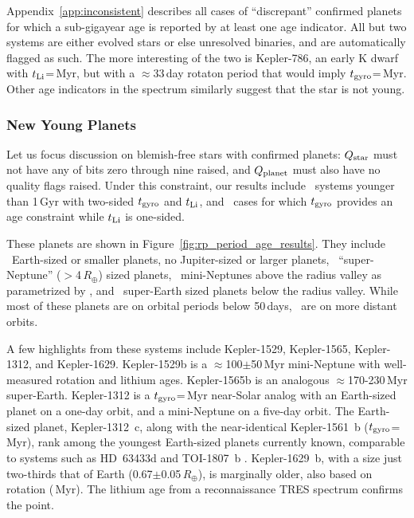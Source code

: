 \documentclass[11pt,twocolumn,tighten]{aastex63}
\begin{document}
Appendix~\ref{app:inconsistent} describes all cases of ``discrepant''
confirmed planets for which a sub-gigayear age is reported by at least
one age indicator.  All but two systems are either evolved stars or
else unresolved binaries, and are automatically flagged as such.  The
more interesting of the two is Kepler-786, an early K dwarf with
$t_{\rm Li}$=\kepseveneightsix\,Myr, but with a $\approx$33\,day
rotaton period that would imply $t_{\rm
gyro}$=\kepseveneightsixgyro\,Myr.  Other age indicators in the
spectrum similarly suggest that the star is not young. 



\subsubsection{New Young Planets}

Let us focus discussion on blemish-free stars with 
confirmed planets: $Q_{\rm star}$ must not have any of bits zero
through nine raised, and $Q_{\rm planet}$ must also have no quality flags
raised.  Under this constraint, our results include
\ltonegyrhighqconfirmedtwosided\ systems younger than 1\,Gyr with
two-sided $t_{\rm gyro}$ and $t_{\rm Li}$, and
\ltonegyrhighqconfirmedonesided\ cases for which $t_{\rm gyro}$
provides an age constraint while $t_{\rm Li}$ is one-sided.

These planets are shown in Figure~\ref{fig:rp_period_age_results}.
They include \nearthshighqconfirmed\ Earth-sized or smaller planets,
no Jupiter-sized or larger planets, \nsubsaturnshighqconfirmed\
``super-Neptune'' ($>$4\,$R_\oplus$) sized planets,
\nminineptuneshighqconfirmed\ mini-Neptunes above the radius valley
as parametrized by \citealt{2018MNRAS.479.4786V}, and
\nsuperearthshighqconfirmed\ super-Earth sized planets below the
radius valley.  While most of these planets are on orbital periods
below 50\,days, \nlongperiodhighqconfirmed\ are on more distant
orbits.

A few highlights from these systems include
Kepler-1529, Kepler-1565, Kepler-1312, and Kepler-1629.  Kepler-1529b
is a $\approx$100$\pm$50\,Myr mini-Neptune with well-measured rotation
and lithium ages.  Kepler-1565b is an analogous $\approx$170-230\,Myr
super-Earth.  Kepler-1312 is a $t_{\rm gyro}$=\kepthirteentwelve\,Myr
near-Solar analog with an Earth-sized planet
on a one-day orbit, and a mini-Neptune on a five-day orbit.  The
Earth-sized planet, Kepler-1312~c, along with the near-identical
Kepler-1561~b ($t_{\rm gyro}$=\kepfifteensixone\,Myr), rank among the
youngest Earth-sized planets currently known, comparable to systems
such as HD~63433d \citep[1.1\,$R_\oplus$,
$414$$\pm$$23$\,Myr;][]{2024AJ....167...54C} and TOI-1807~b
\citep[1.3\,$R_\oplus$, 180$\pm$40\,Myr;][]{2021AJ....162...54H}.
Kepler-1629~b, with a size just two-thirds that of Earth
(0.67$\pm$0.05\,$R_\oplus$), is marginally older, also based on
rotation (\kepsixteentwonine\,Myr).  The lithium age from a
reconnaissance TRES spectrum confirms the point.
\end{document}
